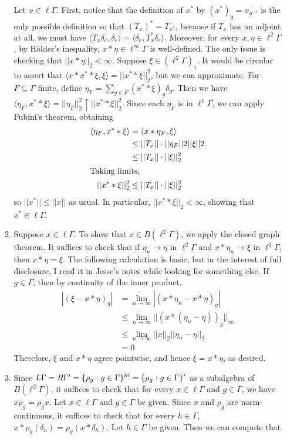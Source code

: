 \documentclass[a4paper,10pt]{report}
\newcommand{\ggen}[1]{\langle#1\rangle}
\newcommand{\pn}[2]{||#1||_{#2}}
\newcommand{\norm}[1]{||#1||}
\DeclarePairedDelimiter{\set}{\{}{\}}
\newcommand{\ol}[1]{\overline{#1}}
\begin{document}
\begin{enumerate}
\begin{enumerate}
				Let $x\in\ell\Gamma$. First, notice that the definition of $x^*$ by $(x^*)_g=\ol{x_{g^{-1}}}$ is the only possible definition so that $(T_x)^*=T_{x^*}$, because if $T_x$ has an adjoint at all, we must have $\ggen{T_x\delta_e,\delta_e}=\ggen{\delta_e,T_x^*\delta_e}$. Moreover, for every $x,\eta\in\ell^2\Gamma$, by {H\"{o}lder's} inequality, $x\ast\eta\in\ell^\infty\Gamma$ is well-defined. The only issue is checking that $\pn{x\ast\eta}{2}<\infty$. Suppose $\xi\in(\ell^2\Gamma)_1$. %
				It would be circular to assert that $\ggen{x\ast x^*\ast\xi,\xi}=\pn{x^*\ast\xi}{2}^2$, but we can approximate. For $F\subseteq\Gamma$ finite, define $\eta_F=\sum_{g\in F}(x^*\ast\xi)_g\delta_g$. Then we have $\ggen{\eta_F,x^*\ast\xi}=\pn{\eta_F}{2}^2\uparrow\pn{x^*\ast\xi}{2}^2$. Since each $\eta_F$ is in $\ell^1\Gamma$, we can apply Fubini's theorem, obtaining 
				\begin{align*}
					\ggen{\eta_F,x^*\ast\xi} &= \ggen{x\ast\eta_F,\xi}\\
					&\le \norm{T_x}\cdot\norm{\eta_F}{2}\norm{\xi}{2}\\
					&\le \norm{T_x}\cdot\pn{\xi}{2}^2\\
					\intertext{Taking limits, }
					\pn{x^*\ast\xi}{2}^2 &\le \norm{T_x}\cdot\pn{\xi}{2}^2
				\end{align*}
				so $\norm{x^*}\le\norm{x}$ as usual. In particular, $\pn{x^*\ast\xi}{2}<\infty$, showing that $x^*\in\ell\Gamma$. 
			\item Suppose $x\in\ell\Gamma$. To show that $x\in B(\ell^2\Gamma)$, we apply the closed graph theorem. It suffices to check that if $\eta_n\to\eta$ in $\ell^2\Gamma$ and $x\ast\eta_n\to\xi$ in $\ell^2\Gamma$, then $x\ast\eta=\xi$. The following calculation is basic, but in the interest of full disclosure, I read it in Jesse's notes while looking for something else. If $g\in\Gamma$, then by continuity of the inner product, 
				\begin{align*}
					|(\xi-x\ast\eta)_g| &= \lim_{n\to\infty}|(x\ast\eta_n-x\ast\eta)_g|\\
					&\le \lim_{n\to\infty}\pn{(x\ast(\eta_n-\eta))_g}{\infty}\\
					&\le \lim_{n\to\infty}\pn{x}{2}\pn{\eta_n-\eta}{2}\\
					&= 0
				\end{align*}
				Therefore, $\xi$ and $x\ast\eta$ agree pointwise, and hence $\xi=x\ast\eta$, as desired. 
			\item Since $L\Gamma=R\Gamma'=\set{\rho_g:g\in\Gamma}'''=\set{\rho_g:g\in\Gamma}'$ as a subalgebra of $B(\ell^2\Gamma)$, it suffices to check that for every $x\in\ell\Gamma$ and $g\in\Gamma$, we have $x\rho_g=\rho_gx$. Let $x\in\ell\Gamma$ and $g\in\Gamma$ be given. Since $x$ and $\rho_g$ are norm-continuous, it suffices to check that for every $h\in\Gamma$, $x\ast\rho_g(\delta_h)=\rho_g(x\ast\delta_h)$. Let $h\in\Gamma$ be given. Then we can compute that 

\end{enumerate}
\end{enumerate}
\end{document}
